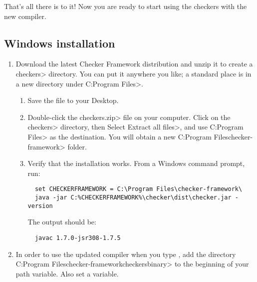 That's all there is to it!  Now you are ready to start using the checkers with
the new  compiler.

\subsection{Windows installation\label{windows-installation}}

\begin{enumerate}

\item
  Download the latest Checker Framework distribution
  and unzip it to create a \<checkers> directory.  You can put it anywhere
  you like; a standard place is in a new directory under \<C:\ttbs{}Program
  Files>.

\begin{enumerate}
\item
  Save the file
  to your Desktop.
\item
  Double-click the \<checkers.zip> file on your computer.  Click on
  the \<checkers> directory, then Select \<Extract all files>, and use
  \<C:\ttbs{}Program Files> as the destination.  You will obtain a new
  \<C:\ttbs{}Program Files\ttbs{}checker-framework> folder.
\item
  Verify that the installation works.  From a Windows command prompt, run:

\begin{Verbatim}
  set CHECKERFRAMEWORK = C:\Program Files\checker-framework\
  java -jar C:%CHECKERFRAMEWORK%\checker\dist\checker.jar -version
\end{Verbatim}

The output should be:

\begin{Verbatim}
  javac 1.7.0-jsr308-1.7.5
\end{Verbatim}

\end{enumerate}


\item
\begin{sloppypar}
  In order to use the updated compiler when you type , add the
  directory \<C:\ttbs{}Program Files\ttbs{}checker-framework\ttbs{}checkers\ttbs{}binary> to the
  beginning of your path variable.  Also set a \code{CHECKERFRAMEWORK} variable.
\end{sloppypar}


\end{enumerate}
